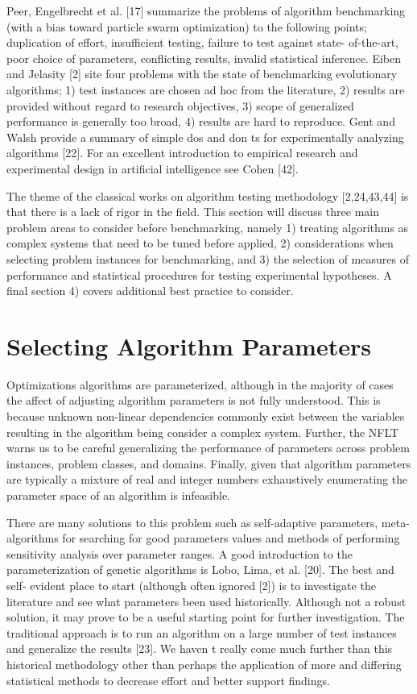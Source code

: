 \documentclass[a4paper, 11pt]{article}
\begin{document}
Peer, Engelbrecht et al. [17] summarize the problems of algorithm benchmarking (with a bias toward particle swarm optimization) to the following points; duplication of effort, insufficient testing, failure to test against state- of-the-art, poor choice of parameters, conflicting results, invalid statistical inference. Eiben and Jelasity [2] site four problems with the state of benchmarking evolutionary algorithms; 1) test instances are chosen ad hoc from the literature, 2) results are provided without regard to research objectives, 3) scope of generalized performance is generally too broad, 4) results are hard to reproduce.
Gent and Walsh provide a summary of simple dos and don ts for experimentally analyzing algorithms [22]. For an excellent introduction to empirical research and experimental design in artificial intelligence see Cohen [42].

The theme of the classical works on algorithm testing methodology [2,24,43,44] is that there is a lack of rigor in the field. This section will discuss three main problem areas to consider before benchmarking, namely 1) treating algorithms as complex systems that need to be tuned before applied, 2) considerations when selecting problem instances for benchmarking, and 3) the selection of measures of performance and statistical procedures for testing experimental hypotheses. A final section 4) covers additional best practice to consider.


% 
% 
\section{Selecting Algorithm Parameters}
Optimizations algorithms are parameterized, although in the majority of cases the affect of adjusting algorithm parameters is not fully understood. This is because unknown non-linear dependencies commonly exist between the variables resulting in the algorithm being consider a complex system. Further, the NFLT warns us to be careful generalizing the performance of parameters across problem instances, problem classes, and domains. Finally, given that algorithm parameters are typically a mixture of real and integer numbers exhaustively enumerating the parameter space of an algorithm is infeasible.

There are many solutions to this problem such as self-adaptive parameters, meta-algorithms for searching for good parameters values and methods of performing sensitivity analysis over parameter ranges. A good introduction to the parameterization of genetic algorithms is Lobo, Lima, et al. [20]. The best and self- evident place to start (although often ignored [2]) is to investigate the literature and see what parameters been used historically. Although not a robust solution, it may prove to be a useful starting point for further investigation. The traditional approach is to run an algorithm on a large number of test instances and generalize the results [23]. We haven t really come much further than this historical methodology other than perhaps the application of more and differing statistical methods to decrease effort and better support findings.
\end{document}
